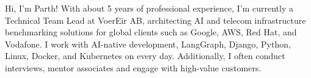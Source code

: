 

\begin{cvparagraph}

Hi, I'm Parth! With about 5 years of professional experience, I'm currently a Technical Team Lead at VoerEir AB, architecting AI and telecom infrastructure benchmarking solutions for global clients such as Google, AWS, Red Hat, and Vodafone. I work with AI-native development, LangGraph, Django, Python, Linux, Docker, and Kubernetes on every day. Additionally, I often conduct interviews, mentor associates and engage with high-value customers.
\end{cvparagraph}
